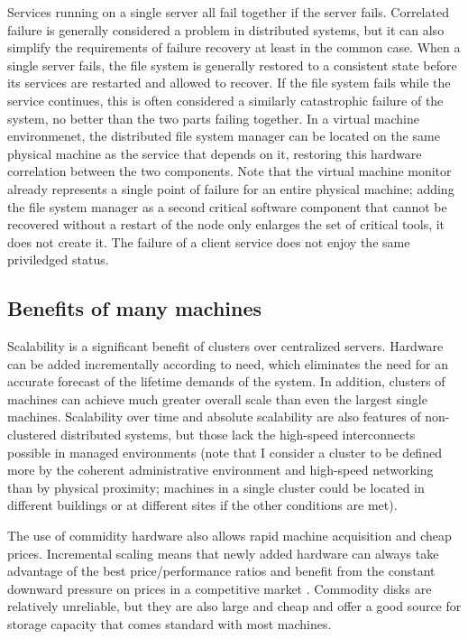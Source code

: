 Services running on a single server all fail together if the server fails. Correlated failure is generally considered a problem in distributed systems, but it can also simplify the requirements of failure recovery at least in the common case. When a single server fails, the file system is generally restored to a consistent state before its services are restarted and allowed to recover. If the file system fails while the service continues, this is often considered a similarly catastrophic failure of the system, no better than the two parts failing together. In a virtual machine environmenet, the distributed file system manager can be located on the same physical machine as the service that depends on it, restoring this hardware correlation between the two components. Note that the virtual machine monitor already represents a single point of failure for an entire physical machine; adding the file system manager as a second critical software component that cannot be recovered without a restart of the node only enlarges the set of critical tools, it does not create it. The failure of a client service does not enjoy the same priviledged status.

\subsection{Benefits of many machines}

Scalability is a significant benefit of clusters over centralized servers. Hardware can be added incrementally according to need, which eliminates the need for an accurate forecast of the lifetime demands of the system. In addition, clusters of machines can achieve much greater overall scale than even the largest single machines. Scalability over time and absolute scalability are also features of non-clustered distributed systems, but those lack the high-speed interconnects possible in managed environments (note that I consider a cluster to be defined more by the coherent administrative environment and high-speed networking than by physical proximity; machines in a single cluster could be located in different buildings or at different sites if the other conditions are met).

The use of commidity hardware also allows rapid machine acquisition and cheap prices. Incremental scaling means that newly added hardware can always take advantage of the best price/performance ratios and benefit from the constant downward pressure on prices in a competitive market \cite{fox}. Commodity disks are relatively unreliable, but they are also large and cheap and offer a good source for storage capacity \cite{patterson,warfield} that comes standard with most machines.


